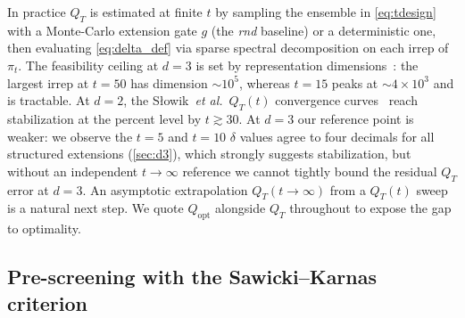 \documentclass[twocolumn,superscriptaddress,showpacs,nofootinbib,notitlepage,preprintnumbers,secnumarabic,amssymb, nobibnotes, aps, prd]{revtex4-2}
\newcommand{\QT}{Q_{T}}              %
\newcommand{\Popt}{Q_{\mathrm{opt}}} %
\begin{document}
In practice $\QT$ is estimated at finite $t$ by sampling the ensemble in \cref{eq:tdesign} with a Monte-Carlo extension gate $g$ (the \emph{rnd} baseline) or a deterministic one, then evaluating \cref{eq:delta_def} via sparse spectral decomposition on each irrep of $\pi_t$. The feasibility ceiling at $d=3$ is set by representation dimensions~\cite{Slowik:2025qco}: the largest irrep at $t = 50$ has dimension $\sim 10^5$, whereas $t = 15$ peaks at $\sim 4\times 10^3$ and is tractable. At $d=2$, the S{\l}owik~\emph{et al.}\ $\QT(t)$ convergence curves~\cite{Slowik:2025qco} reach stabilization at the percent level by $t\gtrsim 30$. At $d=3$ our reference point is weaker: we observe the $t=5$ and $t=10$ $\delta$ values agree to four decimals for all structured extensions (\cref{sec:d3}), which strongly suggests stabilization, but without an independent $t\to\infty$ reference we cannot tightly bound the residual $\QT$ error at $d=3$. An asymptotic extrapolation $\QT(t\to\infty)$ from a $\QT(t)$ sweep is a natural next step. We quote $\Popt$ alongside $\QT$ throughout to expose the gap to optimality.

\subsection{Pre-screening with the Sawicki--Karnas criterion}\label{sec:qco_sawicki}
\end{document}
